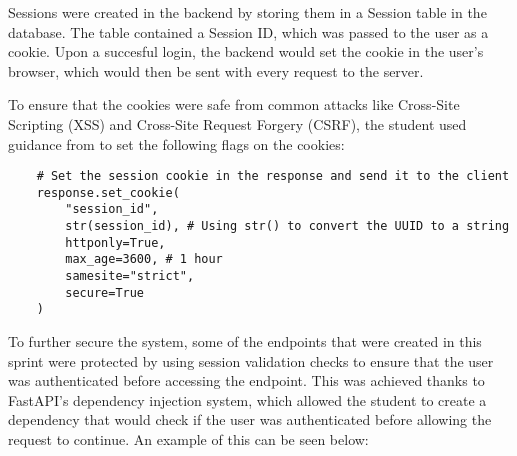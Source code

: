Sessions were created in the backend by storing them in a Session table in the database. The table contained a Session ID, which was passed to the user as a cookie. Upon a succesful login, the backend would set the cookie in the user's browser, which would then be sent with every request to the server. 

To ensure that the cookies were safe from common attacks like Cross-Site Scripting (XSS) and Cross-Site Request Forgery (CSRF), the student used guidance from \cite{owasp,mozilla} to set the following flags on the cookies:

\begin{lstlisting}
    # Set the session cookie in the response and send it to the client
    response.set_cookie(
        "session_id",
        str(session_id), # Using str() to convert the UUID to a string
        httponly=True,
        max_age=3600, # 1 hour
        samesite="strict",
        secure=True
    )
\end{lstlisting}

To further secure the system, some of the endpoints that were created in this sprint were protected by using session validation checks to ensure that the user was authenticated before accessing the endpoint. This was achieved thanks to FastAPI's dependency injection system, which allowed the student to create a dependency that would check if the user was authenticated before allowing the request to continue. An example of this can be seen below:

